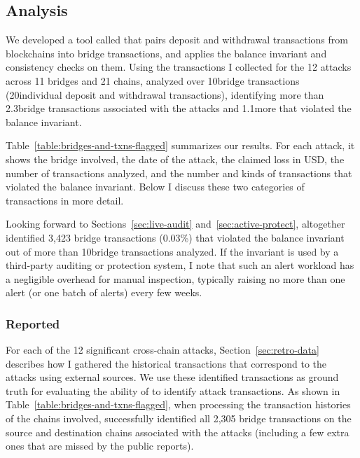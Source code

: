 \subsection{Analysis}

\label{sec:retro-analysis}


We developed a tool called \offlinetool that pairs deposit and
withdrawal transactions from blockchains into bridge transactions, and
applies the balance invariant and consistency checks on them.  Using
the transactions I collected for the 12 attacks across 11 bridges and
21 chains, \offlinetool analyzed over 10\mil bridge transactions (20\mil individual deposit and withdrawal transactions),
identifying more than 2.3\thou bridge transactions associated with the
attacks and 1.1\thou more that violated the balance invariant.


Table~\ref{table:bridges-and-txns-flagged} summarizes our results.
For each attack, it shows the bridge involved, the date of the attack,
the claimed loss in USD, the number of transactions \offlinetool
analyzed, and the number and kinds of transactions that violated the
balance invariant.
%
Below I discuss these two categories of transactions in more detail.

Looking forward to Sections~\ref{sec:live-audit}
and~\ref{sec:active-protect}, altogether \offlinetool identified 3,423
bridge transactions (0.03\%) that violated the balance invariant out
of more than 10\mil bridge transactions analyzed.  If the invariant is used by a
third-party auditing or protection system, I note that such an alert
workload has a negligible overhead for manual inspection, typically
raising no more than one alert (or one batch of alerts) every few
weeks.

\subsubsection{Reported}

For each of the 12 significant cross-chain attacks,
Section~\ref{sec:retro-data} describes how I gathered the historical
transactions that correspond to the attacks using external sources.
We use these identified transactions as ground truth for evaluating
the ability of \offlinetool to identify attack transactions.  As shown
in Table~\ref{table:bridges-and-txns-flagged}, when processing the
transaction histories of the chains involved, \offlinetool
successfully identified all 2,305 bridge transactions on the source
and destination chains associated with the attacks (including a few extra ones that are missed by the public reports).

